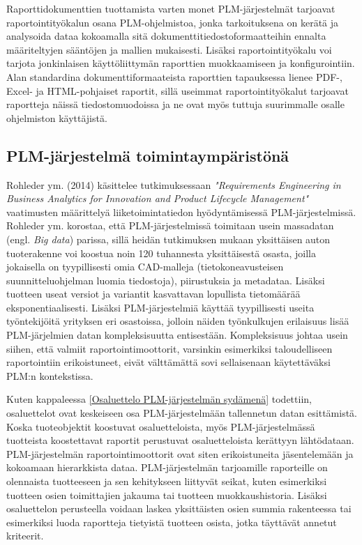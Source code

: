 Raporttidokumenttien tuottamista varten monet PLM-järjestelmät tarjoavat raportointityökalun osana PLM-ohjelmistoa, jonka tarkoituksena on kerätä ja analysoida dataa kokoamalla sitä dokumenttitiedostoformaatteihin ennalta määriteltyjen sääntöjen ja mallien mukaisesti. Lisäksi raportointityökalu voi tarjota jonkinlaisen käyttöliittymän raporttien muokkaamiseen ja konfigurointiin. Alan standardina dokumenttiformaateista raporttien tapauksessa lienee PDF-, Excel- ja HTML-pohjaiset raportit, sillä useimmat raportointityökalut tarjoavat raportteja näissä tiedostomuodoissa ja ne ovat myös tuttuja suurimmalle osalle ohjelmiston käyttäjistä. 

\subsection{PLM-järjestelmä toimintaympäristönä} \label{PLM-järjestelmä toimintaympäristönä}

Rohleder ym. (2014) käsittelee tutkimuksessaan \textit{"Requirements Engineering in Business Analytics for Innovation and Product Lifecycle Management"} vaatimusten määrittelyä liiketoimintatiedon hyödyntämisessä PLM-järjestelmissä. Rohleder ym. korostaa, että PLM-järjestelmissä toimitaan usein massadatan (engl. \textit{Big data})  parissa, sillä heidän tutkimuksen mukaan yksittäisen auton tuoterakenne voi koostua noin 120 tuhannesta yksittäisestä osasta, joilla jokaisella on tyypillisesti omia CAD-malleja (tietokoneavusteisen suunnitteluohjelman luomia tiedostoja), piirustuksia ja metadataa. Lisäksi tuotteen useat versiot ja variantit kasvattavan lopullista tietomäärää eksponentiaalisesti. Lisäksi PLM-järjestelmiä käyttää tyypillisesti useita työntekijöitä yrityksen eri osastoissa, jolloin näiden työnkulkujen erilaisuus lisää PLM-järjelmien datan kompleksisuutta entisestään. Kompleksisuus johtaa usein siihen, että valmiit raportointimoottorit, varsinkin esimerkiksi taloudelliseen raportointiin erikoistuneet, eivät välttämättä sovi sellaisenaan käytettäväksi PLM:n kontekstissa. \cite{rohleder_requirements_2014}

Kuten kappaleessa \ref{Osaluettelo PLM-järjestelmän sydämenä} todettiin, osaluettelot ovat keskeiseen osa PLM-järjestelmään tallennetun datan esittämistä. Koska tuoteobjektit koostuvat osaluetteloista, myös PLM-järjestelmässä tuotteista koostettavat raportit perustuvat osaluetteloista kerättyyn lähtödataan. PLM-järjestelmän raportointimoottorit ovat siten erikoistuneita jäsentelemään ja kokoamaan hierarkkista dataa. \cite{rohleder_requirements_2014} PLM-järjestelmän tarjoamille raporteille on olennaista tuotteeseen ja sen kehitykseen liittyvät seikat, kuten esimerkiksi tuotteen osien toimittajien jakauma tai tuotteen muokkaushistoria. Lisäksi osaluettelon perusteella voidaan laskea yksittäisten osien summia rakenteessa tai esimerkiksi luoda raportteja tietyistä tuotteen osista, jotka täyttävät annetut kriteerit.

